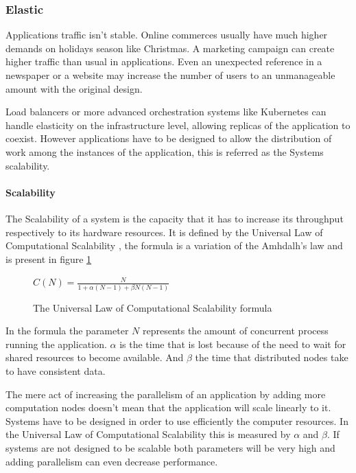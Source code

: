 \documentclass[../main.tex]{subfiles}
\begin{document}
\subsubsection{Elastic}

Applications traffic isn't stable. Online commerces usually have much higher
demands on holidays season like Christmas. A marketing campaign can create
higher traffic than usual in applications. Even an unexpected reference in a
newspaper or a website may increase the number of users to an unmanageable
amount with the original design.

Load balancers or more advanced orchestration systems like Kubernetes
\cite{Production-GradeKubernetes} can handle elasticity on the infrastructure
level, allowing replicas of the application to coexist. However applications
have to be designed to allow the distribution of work among the instances of the
application, this is referred as the Systems scalability.

\paragraph{Scalability}

The Scalability of a system is the capacity that it has to increase its
throughput respectively to its hardware resources. It is defined by the
Universal Law of Computational Scalability \autocite{Gunther2008AFunctions}, the formula
is a variation of the Amhdalh's law \autocite{Rodgers1985ImprovementsDesign} and is present in figure \ref{fig:scalability}

\begin{figure}[ht] \centering
  $C(N)={\frac {N}{1+\alpha (N-1)+\beta N(N-1)}}$
  \caption{The Universal Law of Computational Scalability formula}
  \label{fig:scalability}
\end{figure}

In the formula the parameter $N$ represents the amount of concurrent process
running the application. $\alpha$ is the time that is lost because of the need
to wait for shared resources to become available. And $\beta$ the time that
distributed nodes take to have consistent data.

The mere act of increasing the parallelism of an application by adding more
computation nodes doesn't mean that the application will scale linearly to it.
Systems have to be designed in order to use efficiently the computer resources.
In the Universal Law of Computational Scalability this is measured by $\alpha$
and $\beta$. If systems are not designed to be scalable both parameters will
be very high and adding parallelism can even decrease performance.
\end{document}
